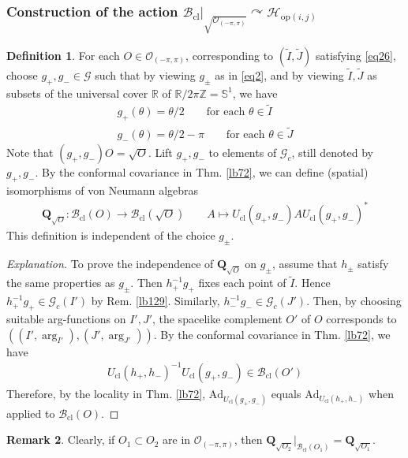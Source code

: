 \documentclass[11pt,b5paper,notitlepage]{article}
\theoremstyle{definition}
\newtheorem{df}{Definition}[section]
\newtheorem{rem}[df]{Remark}
\theoremstyle{plain}
\newcommand{\wtd}{\widetilde}
\newcommand{\Ad}{\mathrm{Ad}}
\newcommand{\Zbb}{\mathbb Z}
\newcommand{\Rbb}{\mathbb R}
\newcommand{\Sbb}{{\mathbb S}}
\newcommand{\Gc}{\mathscr G_c}
\newcommand{\SG}{\mathscr G}
\newcommand{\Qbf}{\mathbf Q}
\newcommand{\Bcl}{\mathcal B_{\mathrm{cl}}}
\newcommand{\Opp}{\mathcal O_{(-\pi,\pi)}}
\newcommand{\ZOpp}{\sqrt{\mathcal O_{(-\pi,\pi)}}}
\newcommand{\Ucl}{U_{\mathrm{cl}}}
\newcommand{\Hopij}{\mathcal H_{\mathrm{op}(i,j)}}
\numberwithin{equation}{section}
\begin{document}
\subsubsection{Construction of the action $\Bcl\big|_{\ZOpp}\curvearrowright\Hopij$}


\begin{df}\label{lb127}
For each $O\in\Opp$, corresponding to $(\wtd I,\wtd J)$ satisfying \eqref{eq26}, choose $g_+,g_-\in\SG$ such that by viewing $g_\pm$ as in \eqref{eq2}, and by viewing $\wtd I,\wtd J$ as subsets of the universal cover $\Rbb$ of $\Rbb/2\pi\Zbb=\Sbb^1$, we have
\begin{gather*}
g_+(\theta)=\theta/2\qquad \text{for each }\theta\in \wtd I\\
g_-(\theta)=\theta/2-\pi\qquad \text{for each }\theta\in \wtd J
\end{gather*}
Note that $(g_+,g_-)O=\sqrt O$. Lift $g_+,g_-$ to elements of $\Gc$, still denoted by $g_+,g_-$. By the conformal covariance in Thm. \ref{lb72}, we can define (spatial) isomorphisms of von Neumann algebras
\begin{gather*}
\Qbf_{\sqrt O}:\Bcl(O)\rightarrow\Bcl(\sqrt O)\qquad A\mapsto \Ucl(g_+,g_-)A\Ucl(g_+,g_-)^*
\end{gather*}
This definition is independent of the choice $g_\pm$. 
\end{df}

\begin{proof}[Explanation]
To prove the independence of $\Qbf_{\sqrt O}$ on $g_\pm$, assume that $h_\pm$ satisfy the same properties as $g_\pm$. Then $h_+^{-1}g_+$ fixes each point of $\wtd I$. Hence $h_+^{-1}g_+\in\Gc(I')$ by Rem. \ref{lb129}. Similarly, $h_-^{-1}g_-\in\Gc(J')$. Then, by choosing suitable arg-functions on $I',J'$, the spacelike complement $O'$ of $O$ corresponds to $((I',\arg_{I'}),(J',\arg_{J'}))$. By the conformal covariance in Thm. \ref{lb72}, we have
\begin{align*}
\Ucl(h_+,h_-)^{-1}\Ucl(g_+,g_-)\in\Bcl(O')
\end{align*}
Therefore, by the locality in Thm. \ref{lb72},  $\Ad_{\Ucl(g_+,g_-)}$ equals $\Ad_{\Ucl(h_+,h_-)}$ when applied to $\Bcl(O)$.
\end{proof}

\begin{rem}\label{lb128}
Clearly, if $O_1\subset O_2$ are in $\Opp$, then $\Qbf_{\sqrt{O_2}}\big|_{\Bcl(O_1)}=\Qbf_{\sqrt{O_1}}$.
\end{rem}
\end{document}
